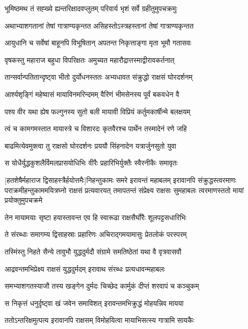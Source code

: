 \twolineshloka
{भूमिष्ठमथ तं सह्ख्ये ह्यन्तरिक्षादवप्लुतम्}
{परिवार्य भृशं सर्वे ग्रहीतुमुपचक्रमुः}


\twolineshloka
{अथाभ्याशगतानां तेषां गात्राण्यकृन्तत}
{असिहस्तोऽस्त्रहस्तानां तेषां गात्राण्यकृन्तत}


\twolineshloka
{आयुधानि च सर्वेषां बाहूनपि विभूषितान्}
{अपतन्त निकृत्ताङ्गा मृता भूमौ गतासवः}


\twolineshloka
{वृषकस्तु महाराज बहुधा विपरिक्षतः}
{अमुच्यत महारौद्रात्तस्माद्वीरावकर्तनात्}


\twolineshloka
{तान्सर्वान्पतितान्दृष्ट्वा भीतो दुर्योधनस्ततः}
{अभ्यधावत संक्रुद्धो राक्षसं घोरदर्शनम्}


\twolineshloka
{आर्श्यशृङ्गिं महेष्वासं मायाविनमरिन्दमम्}
{वैरिणं भीमसेनस्य पूर्वं बकवधेन वै}


\twolineshloka
{पश्य वीर यथा ह्येष फल्गुनस्य सुतो बली}
{मायावी विप्रियं कर्तुमकार्षीन्मे बलक्षयम्}


\twolineshloka
{त्वं च कामगमस्तात मायास्त्रे च विशारदः}
{कृतवैरश्च पार्थेन तस्मादेनं रणे जहि}


\twolineshloka
{बाढमित्येवमुक्त्वा तु राक्षसो घोरदर्शनः}
{प्रययौ सिंहनादेन यत्रार्जुनसुतो युवा}


\twolineshloka
{स योधैर्युद्धकुशलैर्विमलप्रासयोधिभिः}
{वीरैः प्रहारिभिर्युक्तैः स्वैरनीकैः समावृतः}


[हतशेषैर्महाराज द्विसाहस्त्रैर्हयोत्तमैः]निहन्तुकामः समरे इरावन्तं महाबलम्
इरावानपि संक्रुद्धस्त्वरमाणः पराक्रमीहन्तुकाममयित्रघ्नो राक्षसं प्रत्यवारयत्
\twolineshloka
{तमापतन्तं संप्रेक्ष्य राक्षसः सुमहाबलः}
{त्वरमाणस्ततो मायां प्रयोक्तुमुपचक्रमे}


\twolineshloka
{तेन मायामयाः सृष्टा हयास्तावन्त एव हि}
{स्वारूढा राक्षसैर्घोरैः शूलपट्टसधारिभिः}


\twolineshloka
{ते संरब्धाः समागम्य द्विसाहस्राः प्रहारिणः}
{अचिराद्गमयामासुः प्रेतलोकं परस्परम्}


\twolineshloka
{तस्मिंस्तु निहते सैन्ये तावुभौ युद्धदुर्मदौ}
{संग्रामे समतिष्ठेतां यथा वै वृत्रवासवौ}


\twolineshloka
{आद्रवन्तमभिप्रेक्ष्य राक्षसं युद्धदुर्मदम्}
{इरावाथ संरब्धः प्रत्यधावन्महाबलः}


\twolineshloka
{समभ्याशगतस्याजौ तस्य खङ्गेन दुर्मदः}
{चिच्छेद कार्मुकं दीप्तं शरवापं च कञ्चुकम्}


\twolineshloka
{स निकृत्तं धनुर्दृष्ट्वा खं जवेन समाविशत्}
{इरावन्तमभिक्रुद्धं मोहयन्निव मायया}


\twolineshloka
{ततोऽन्तरिक्षमुत्पत्य इरावानपि राक्षसम्}
{विमोहयित्वा मायाभिसत्स्य गात्रामि सायकैः}


